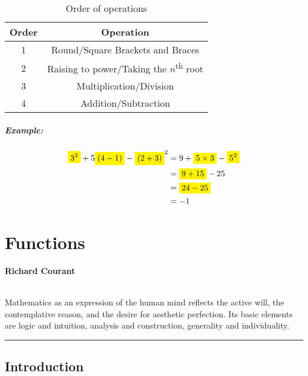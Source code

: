 \documentclass[a5paper,9pt]{book}
\theoremstyle{definition}
\newcommand{\qq}[2]{%
    \begin{center}

        \begin{minipage}{0.75\textwidth}

          \hrulefill\hspace{2.5mm}\textbf{#2}\hspace{2.5mm}\hrulefill\medskip

          \hspace*{\fill}{\Large\textbf{``}}\hspace*{\fill} \\
          #1 \\[\baselineskip]
          \hspace*{\fill}{\Large\textbf{''}}\hspace*{\fill}

          \smallskip\hrule

        \end{minipage}

    \end{center}
}
\newcommand{\mhl}[1]{\colorbox{yellow}{\(\displaystyle #1\)}}
\begin{document}
        \begin{table}[ht!]
            \centering
            \begin{threeparttable}
            \caption{Order of operations}\label{tab:order_of_operations}
            \begin{tabular}{cc}
                \toprule
                \textbf{Order} & \textbf{Operation} \\
                \midrule
                1 & Round/Square Brackets and Braces \\
                2 & Raising to power/Taking the $n$\textsuperscript{th} root \\
                3 & Multiplication/Division \\
                4 & Addition/Subtraction \\
                \bottomrule
            \end{tabular}
            \end{threeparttable}
        \end{table}

        \paragraph{Example:}

        \begin{align*}
           \mhl{3^2}+5\mhl{(4-1)} - {\mhl{(2+3)}}^2 &= 9 + \mhl{5\times 3} - \mhl{5^2} \\
                                       &= \mhl{9 + 15} - 25 \\
                                       &= \mhl{24 - 25} \\
                                       &= -1
        \end{align*}

        \pagebreak

    \chapter{Functions}%
        \label{chap:functions}
        \qq{Mathematics as an expression of the human mind reflects the active will, the contemplative reason, and the desire for aesthetic perfection. Its basic elements are logic and intuition, analysis and construction, generality and individuality.}
        {Richard Courant}
        \newpage

        \section{Introduction}%
            \label{sec:functions_intro}
\end{document}
